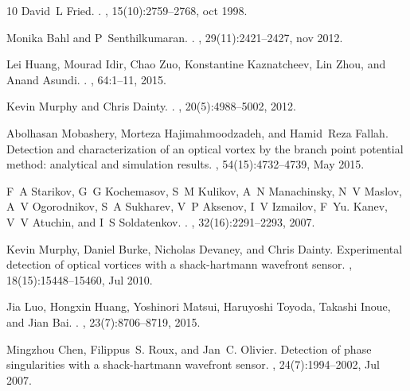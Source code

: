 \documentclass[10pt,twocolumn,twoside,letterpaper]{article}
\begin{document}
\begin{thebibliography}{10}
David~L Fried.
.
, 15(10):2759--2768, oct 1998.

Monika Bahl and P~Senthilkumaran.
.
, 29(11):2421--2427, nov 2012.

Lei Huang, Mourad Idir, Chao Zuo, Konstantine Kaznatcheev, Lin Zhou, and Anand
  Asundi.
.
, 64:1--11, 2015.

Kevin Murphy and Chris Dainty.
.
, 20(5):4988--5002, 2012.

Abolhasan Mobashery, Morteza Hajimahmoodzadeh, and Hamid~Reza Fallah.
\newblock Detection and characterization of an optical vortex by the branch
  point potential method: analytical and simulation results.
, 54(15):4732--4739, May 2015.

F~A Starikov, G~G Kochemasov, S~M Kulikov, A~N Manachinsky, N~V Maslov, A~V
  Ogorodnikov, S~A Sukharev, V~P Aksenov, I~V Izmailov, F~Yu. Kanev, V~V
  Atuchin, and I~S Soldatenkov.
.
, 32(16):2291--2293, 2007.

Kevin Murphy, Daniel Burke, Nicholas Devaney, and Chris Dainty.
\newblock Experimental detection of optical vortices with a shack-hartmann
  wavefront sensor.
, 18(15):15448--15460, Jul 2010.

Jia Luo, Hongxin Huang, Yoshinori Matsui, Haruyoshi Toyoda, Takashi Inoue, and
  Jian Bai.
.
, 23(7):8706--8719, 2015.

Mingzhou Chen, Filippus~S. Roux, and Jan~C. Olivier.
\newblock Detection of phase singularities with a shack-hartmann wavefront
  sensor.
, 24(7):1994--2002, Jul 2007.


\end{thebibliography}
\end{document}
